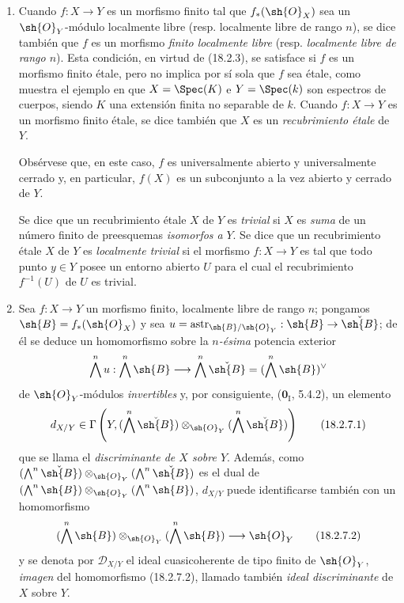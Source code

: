 \begin{remarks}[18.2.7]
\label{IV.18.2.7}
\begin{enumerate}
  \item[(i)] Cuando $f:X\to Y$ es un morfismo finito tal que $f_*(\sh{O}_X)$ sea un $\sh{O}_Y$-módulo localmente libre (resp. localmente libre de rango $n$), se dice también que $f$ es un morfismo \emph{finito localmente libre} (resp. \emph{localmente libre de rango $n$}). Esta condición, en virtud de (18.2.3), se satisface si $f$ es un morfismo finito étale, pero no implica por sí sola que $f$ sea étale, como muestra el ejemplo en que $X=\Spec(K)$ e $Y=\Spec(k)$ son espectros de cuerpos, siendo $K$ una extensión finita no separable de $k$. Cuando $f:X\to Y$ es un morfismo finito étale, se dice también que $X$ es un \emph{recubrimiento étale} de $Y$.

Obsérvese que, en este caso, $f$ es universalmente abierto y universalmente cerrado y, en particular, $f(X)$ es un subconjunto a la vez abierto y cerrado de $Y$.

Se dice que un recubrimiento étale $X$ de $Y$ es \emph{trivial} si $X$ es \emph{suma} de un número finito de preesquemas \emph{isomorfos a} $Y$. Se dice que un recubrimiento étale $X$ de $Y$ es \emph{localmente trivial} si el morfismo $f:X\to Y$ es tal que todo punto $y\in Y$ posee un entorno abierto $U$ para el cual el recubrimiento $f^{-1}(U)$ de $U$ es trivial.

  \item[(ii)] Sea $f:X\to Y$ un morfismo finito, localmente libre de rango $n$; pongamos $\sh{B}=f_*(\sh{O}_X)$ y sea $u=\operatorname{astr}_{\sh{B}/\sh{O}_Y}:\sh{B}\to\check{\sh{B}}$; de él se deduce un homomorfismo sobre la \emph{$n$-ésima} potencia exterior
\[
  \bigwedge^n u:\bigwedge^n\sh{B}\longrightarrow\bigwedge^n\check{\sh{B}}=(\bigwedge^n\sh{B})^\vee
\]
de $\sh{O}_Y$-módulos \emph{invertibles} y, por consiguiente, ($\mathbf 0_{\mathrm I}$, 5.4.2), un elemento
\begin{equation}
  d_{X/Y}\in\Gamma\left(Y,(\bigwedge^n\check{\sh{B}})\otimes_{\sh{O}_Y}(\bigwedge^n\check{\sh{B}})\right)
  \tag{18.2.7.1}\label{IV.18.2.7.1}
\end{equation}
que se llama el \emph{discriminante de $X$ sobre $Y$}. Además, como $(\bigwedge^n\check{\sh{B}})\otimes_{\sh{O}_Y}(\bigwedge^n\check{\sh{B}})$ es el dual de $(\bigwedge^n\sh{B})\otimes_{\sh{O}_Y}(\bigwedge^n\sh{B})$, $d_{X/Y}$ puede identificarse también con un homomorfismo
\begin{equation}
  (\bigwedge^n\sh{B})\otimes_{\sh{O}_Y}(\bigwedge^n\sh{B})\longrightarrow\sh{O}_Y
  \tag{18.2.7.2}\label{IV.18.2.7.2}
\end{equation}
y se denota por $\mathscr{D}_{X/Y}$ el ideal cuasicoherente de tipo finito de $\sh{O}_Y$, \emph{imagen} del homomorfismo (18.2.7.2), llamado también \emph{ideal discriminante} de $X$ sobre $Y$.
\end{enumerate}
\end{remarks}

